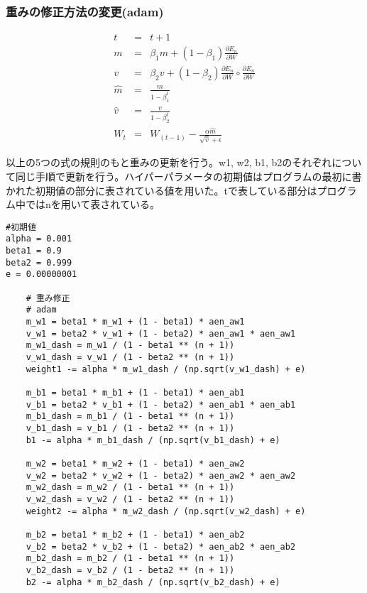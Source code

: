 \documentclass{ujarticle}
\begin{document}
\subsubsection{重みの修正方法の変更(adam)}
\begin{fleqn}[30pt]
\begin{eqnarray}
t &=& t + 1\\
m &=& \beta_1 m + (1 - \beta_1)\frac{\partial E_n}{\partial W}\\
v &=& \beta_2 v + (1 - \beta_2) \frac{\partial E_n}{\partial W} \circ \frac{\partial E_n}{\partial W}\\
\hat{m} &=& \frac{m}{1 - \beta^t_1}\\
\hat{v} &=& \frac{v}{1 - \beta^t_2}\\
W_t &=& W_{(t-1)} - \frac{\alpha \hat{m} }{ \sqrt{\hat{v}} + \epsilon}
\end{eqnarray}
\end{fleqn}

以上の5つの式の規則のもと重みの更新を行う。w1, w2, b1, b2のそれぞれについて同じ手順で更新を行う。ハイパーパラメータの初期値はプログラムの最初に書かれた初期値の部分に表されている値を用いた。tで表している部分はプログラム中ではnを用いて表されている。
\begin{lstlisting}[basicstyle=\ttfamily\footnotesize, frame=single]
#初期値
alpha = 0.001
beta1 = 0.9
beta2 = 0.999
e = 0.00000001

    # 重み修正
    # adam
    m_w1 = beta1 * m_w1 + (1 - beta1) * aen_aw1
    v_w1 = beta2 * v_w1 + (1 - beta2) * aen_aw1 * aen_aw1
    m_w1_dash = m_w1 / (1 - beta1 ** (n + 1))
    v_w1_dash = v_w1 / (1 - beta2 ** (n + 1))
    weight1 -= alpha * m_w1_dash / (np.sqrt(v_w1_dash) + e)

    m_b1 = beta1 * m_b1 + (1 - beta1) * aen_ab1
    v_b1 = beta2 * v_b1 + (1 - beta2) * aen_ab1 * aen_ab1
    m_b1_dash = m_b1 / (1 - beta1 ** (n + 1))
    v_b1_dash = v_b1 / (1 - beta2 ** (n + 1))
    b1 -= alpha * m_b1_dash / (np.sqrt(v_b1_dash) + e)

    m_w2 = beta1 * m_w2 + (1 - beta1) * aen_aw2
    v_w2 = beta2 * v_w2 + (1 - beta2) * aen_aw2 * aen_aw2
    m_w2_dash = m_w2 / (1 - beta1 ** (n + 1))
    v_w2_dash = v_w2 / (1 - beta2 ** (n + 1))
    weight2 -= alpha * m_w2_dash / (np.sqrt(v_w2_dash) + e)

    m_b2 = beta1 * m_b2 + (1 - beta1) * aen_ab2
    v_b2 = beta2 * v_b2 + (1 - beta2) * aen_ab2 * aen_ab2
    m_b2_dash = m_b2 / (1 - beta1 ** (n + 1))
    v_b2_dash = v_b2 / (1 - beta2 ** (n + 1))
    b2 -= alpha * m_b2_dash / (np.sqrt(v_b2_dash) + e)
\end{lstlisting}
\end{document}
